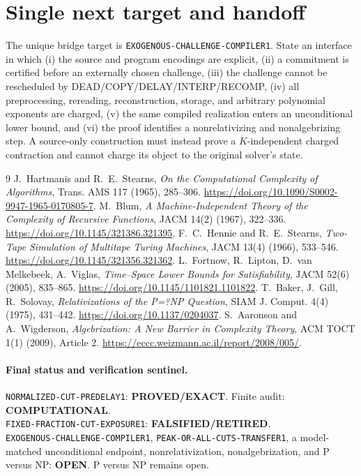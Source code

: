 \documentclass[11pt]{article}
\newcommand{\EXACT}{\textbf{PROVED/EXACT}}
\newcommand{\COMP}{\textbf{COMPUTATIONAL}}
\newcommand{\OPEN}{\textbf{OPEN}}
\newcommand{\RETIRED}{\textbf{FALSIFIED/RETIRED}}
\begin{document}
\section{Single next target and handoff}

The unique bridge target is \texttt{EXOGENOUS-CHALLENGE-COMPILER1}.  State an
interface in which (i) the source and program encodings are explicit, (ii) a
commitment is certified before an externally chosen challenge, (iii) the
challenge cannot be rescheduled by DEAD/COPY/DELAY/INTERP/RECOMP, (iv) all
preprocessing, rereading, reconstruction, storage, and arbitrary polynomial
exponents are charged, (v) the same compiled realization enters an
unconditional lower bound, and (vi) the proof identifies a nonrelativizing and
nonalgebrizing step.  A source-only construction must instead prove a
$K$-independent charged contraction and cannot charge its object to the
original solver's state.

\begin{thebibliography}{9}
 J.~Hartmanis and R.~E.~Stearns,
\emph{On the Computational Complexity of Algorithms}, Trans. AMS 117 (1965),
285--306. \url{https://doi.org/10.1090/S0002-9947-1965-0170805-7}.
 M.~Blum,
\emph{A Machine-Independent Theory of the Complexity of Recursive Functions},
JACM 14(2) (1967), 322--336.
\url{https://doi.org/10.1145/321386.321395}.
 F.~C.~Hennie and R.~E.~Stearns,
\emph{Two-Tape Simulation of Multitape Turing Machines}, JACM 13(4) (1966),
533--546. \url{https://doi.org/10.1145/321356.321362}.
 L.~Fortnow, R.~Lipton, D.~van Melkebeek, A.~Viglas,
\emph{Time--Space Lower Bounds for Satisfiability}, JACM 52(6) (2005),
835--865. \url{https://doi.org/10.1145/1101821.1101822}.
 T.~Baker, J.~Gill, R.~Solovay,
\emph{Relativizations of the P=?NP Question}, SIAM J. Comput. 4(4) (1975),
431--442. \url{https://doi.org/10.1137/0204037}.
 S.~Aaronson and A.~Wigderson,
\emph{Algebrization: A New Barrier in Complexity Theory}, ACM TOCT 1(1)
(2009), Article 2. \url{https://eccc.weizmann.ac.il/report/2008/005/}.
\end{thebibliography}

\paragraph{Final status and verification sentinel.}
\texttt{NORMALIZED-CUT-PREDELAY1}: \EXACT.  Finite audit: \COMP.\\
\texttt{FIXED-FRACTION-CUT-EXPOSURE1}: \RETIRED.\\
\texttt{EXOGENOUS-CHALLENGE-COMPILER1},
\texttt{PEAK-OR-ALL-CUTS-TRANSFER1}, a model-matched unconditional endpoint,
nonrelativization, nonalgebrization, and P versus NP: \OPEN.
P versus NP remains open.
\end{document}
